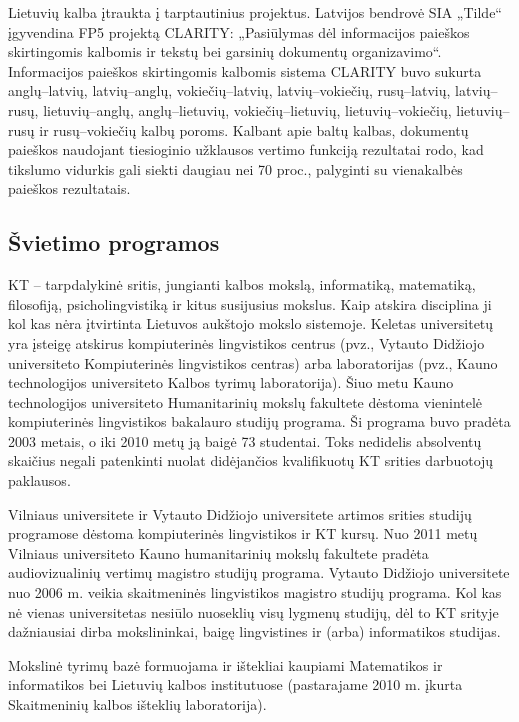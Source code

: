 \begin{multicols}{2}
   Lietuvių kalba įtraukta į tarptautinius projektus. Latvijos bendrovė SIA „Tilde“ įgyvendina  FP5 projektą CLARITY: „Pasiūlymas dėl informacijos paieškos skirtingomis kalbomis ir tekstų bei garsinių dokumentų organizavimo“. Informacijos paieškos skirtingomis kalbomis sistema CLARITY buvo sukurta anglų–latvių, latvių–anglų, vokiečių–latvių, latvių–vokiečių, rusų–latvių, latvių–rusų, lietuvių–anglų, anglų–lietuvių, vokiečių–lietuvių, lietuvių–vokiečių, lietuvių–rusų ir rusų–vokiečių kalbų poroms. Kalbant apie baltų kalbas, dokumentų paieškos naudojant tiesioginio užklausos vertimo funkciją rezultatai rodo, kad tikslumo vidurkis gali siekti daugiau nei 70 proc., palyginti su vienakalbės paieškos rezultatais.

\subsection{Švietimo programos}

KT – tarpdalykinė sritis, jungianti kalbos mokslą, informatiką, matematiką, filosofiją, psicholingvistiką ir kitus susijusius mokslus. Kaip atskira disciplina ji kol kas nėra įtvirtinta Lietuvos aukštojo mokslo sistemoje. Keletas universitetų yra įsteigę atskirus kompiuterinės lingvistikos centrus (pvz., Vytauto Didžiojo universiteto Kompiuterinės lingvistikos centras) arba laboratorijas (pvz., Kauno technologijos universiteto Kalbos tyrimų laboratorija). Šiuo metu Kauno technologijos universiteto Humanitarinių mokslų fakultete dėstoma vienintelė kompiuterinės lingvistikos bakalauro studijų programa. Ši programa buvo pradėta 2003 metais, o iki 2010 metų ją baigė 73 studentai. Toks nedidelis absolventų skaičius negali patenkinti nuolat didėjančios kvalifikuotų KT srities darbuotojų paklausos.  

    Vilniaus universitete ir Vytauto Didžiojo universitete artimos srities studijų programose dėstoma kompiuterinės lingvistikos ir KT kursų. Nuo 2011 metų Vilniaus universiteto Kauno humanitarinių mokslų fakultete pradėta audiovizualinių vertimų magistro studijų programa. Vytauto Didžiojo universitete nuo 2006 m. veikia skaitmeninės lingvistikos magistro studijų programa. Kol kas nė vienas universitetas nesiūlo nuoseklių visų lygmenų studijų, dėl to KT srityje dažniausiai dirba mokslininkai, baigę lingvistines ir (arba) informatikos studijas. 

Mokslinė tyrimų bazė formuojama ir ištekliai kaupiami Matematikos ir informatikos bei Lietuvių kalbos institutuose (pastarajame 2010 m. įkurta Skaitmeninių kalbos išteklių laboratorija).


\end{multicols}
